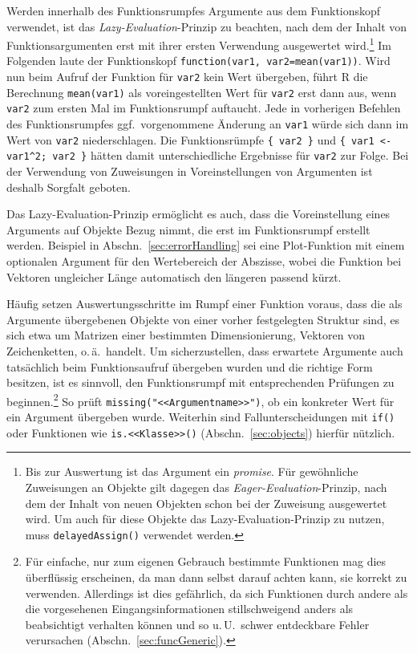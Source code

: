Werden innerhalb des Funktionsrumpfes Argumente aus dem Funktionskopf verwendet, ist das \emph{Lazy-Evaluation}-Prinzip zu beachten, nach dem der Inhalt von Funktionsargumenten erst mit ihrer ersten Verwendung ausgewertet wird.\footnote{Bis zur Auswertung ist das Argument ein \emph{promise}. Für gewöhnliche Zuweisungen an Objekte gilt dagegen das \emph{Eager-Evaluation}-Prinzip, nach dem der Inhalt von neuen Objekten schon bei der Zuweisung ausgewertet wird. Um auch für diese Objekte das Lazy-Evaluation-Prinzip zu nutzen, muss  \lstinline!delayedAssign()! verwendet werden.} Im Folgenden laute der Funktionskopf \lstinline!function(var1, var2=mean(var1))!. Wird nun beim Aufruf der Funktion für \lstinline!var2! kein Wert übergeben, führt R die Berechnung \lstinline!mean(var1)! als voreingestellten Wert für \lstinline!var2! erst dann aus, wenn \lstinline!var2! zum ersten Mal im Funktionsrumpf auftaucht. Jede in vorherigen Befehlen des Funktionsrumpfes ggf.\ vorgenommene Änderung an \lstinline!var1! würde sich dann im Wert von \lstinline!var2! niederschlagen. Die Funktionsrümpfe \lstinline!{ var2 }! und \lstinline!{ var1 <- var1^2; var2 }! hätten damit unterschiedliche Ergebnisse für \lstinline!var2! zur Folge. Bei der Verwendung von Zuweisungen in Voreinstellungen von Argumenten ist deshalb Sorgfalt geboten.

Das Lazy-Evaluation-Prinzip ermöglicht es auch, dass die Voreinstellung eines Arguments auf Objekte Bezug nimmt, die erst im Funktionsrumpf erstellt werden. Beispiel in Abschn.\ \ref{sec:errorHandling} sei eine Plot-Funktion mit einem optionalen Argument für den Wertebereich der Abszisse, wobei die Funktion bei Vektoren ungleicher Länge automatisch den längeren passend kürzt.

Häufig setzen Auswertungsschritte im Rumpf einer Funktion voraus, dass die als Argumente übergebenen Objekte von einer vorher festgelegten Struktur sind, es sich etwa um Matrizen einer bestimmten Dimensionierung, Vektoren von Zeichenketten, o.\,ä.\ handelt. Um sicherzustellen, dass erwartete Argumente auch tatsächlich beim Funktionsaufruf übergeben wurden und die richtige Form besitzen, ist es sinnvoll, den Funktionsrumpf mit entsprechenden Prüfungen zu beginnen.\footnote{Für einfache, nur zum eigenen Gebrauch bestimmte Funktionen mag dies überflüssig erscheinen, da man dann selbst darauf achten kann, sie korrekt zu verwenden. Allerdings ist dies gefährlich, da sich Funktionen durch andere als die vorgesehenen Eingangsinformationen stillschweigend anders als beabsichtigt verhalten können und so u.\,U.\ schwer entdeckbare Fehler verursachen (Abschn.\ \ref{sec:funcGeneric}).} So prüft  \lstinline!missing("<<Argumentname>>")!, ob ein konkreter Wert für ein Argument übergeben wurde. Weiterhin sind Fallunterscheidungen mit \lstinline!if()! oder Funktionen wie \lstinline!is.<<Klasse>>()! (Abschn.\ \ref{sec:objects}) hierfür nützlich.

